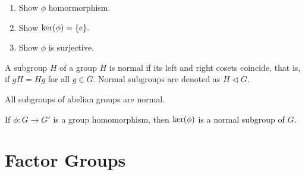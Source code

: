 \begin{note}
    \leavevmode
    \begin{enumerate}[label=(Step \arabic*), leftmargin=*]
        \item Show $\phi$ homormorphism.
        \item Show $\operatorname{ker}(\phi) = \{e\}.$
        \item Show $\phi$ is surjective.
    \end{enumerate}
\end{note}
\begin{definition}
    A subgroup $H$ of a group $H$ is normal if its left and right cosets coincide, that is, if $gH=Hg$ for all $g \in G$. Normal subgroups are denoted as $H \vartriangleleft G$.
\end{definition}
\begin{note}
    All subgroups of abelian groups are normal.
\end{note}
\begin{corollary}
    If $\phi\colon G\to G'$ is a group homomorphism, then $\operatorname{ker}(\phi)$ is a normal subgroup of $G$. 
\end{corollary}

\section{Factor Groups}

